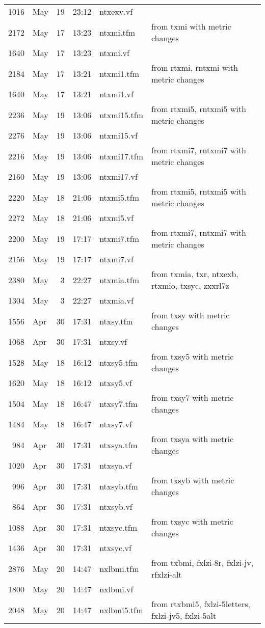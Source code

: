 \documentclass[10pt]{amsart}
\begin{document}
\begin{center}
\begin{longtable}{@{} rlrrll @{}}
1016&May&19&23:12&ntxexv.vf\\
2172&May&17&13:23&ntxmi.tfm& from txmi with metric changes\\
1640&May&17&13:23&ntxmi.vf\\
2184&May&17&13:21&ntxmi1.tfm& from rtxmi, rntxmi with metric changes\\
1640&May&17&13:21&ntxmi1.vf\\
2236&May&19&13:06&ntxmi15.tfm& from rtxmi5, rntxmi5 with metric changes\\
2276&May&19&13:06&ntxmi15.vf\\
2216&May&19&13:06&ntxmi17.tfm& from rtxmi7, rntxmi7 with metric changes\\
2160&May&19&13:06&ntxmi17.vf\\
2220&May&18&21:06&ntxmi5.tfm& from rtxmi5, rntxmi5 with metric changes\\
2272&May&18&21:06&ntxmi5.vf\\
2200&May&19&17:17&ntxmi7.tfm& from rtxmi7, rntxmi7 with metric changes\\
2156&May&19&17:17&ntxmi7.vf\\
2380&May&3&22:27&ntxmia.tfm& from txmia, txr, ntxexb, rtxmio, txsyc, zxxrl7z\\
1304&May&3&22:27&ntxmia.vf\\
1556&Apr&30&17:31&ntxsy.tfm& from txsy with metric changes\\
1068&Apr&30&17:31&ntxsy.vf\\
1528&May&18&16:12&ntxsy5.tfm& from txsy5 with metric changes\\
1620&May&18&16:12&ntxsy5.vf\\
1504&May&18&16:47&ntxsy7.tfm& from txsy7 with metric changes\\
1484&May&18&16:47&ntxsy7.vf\\
984&Apr&30&17:31&ntxsya.tfm& from txsya with metric changes\\
1020&Apr&30&17:31&ntxsya.vf\\
996&Apr&30&17:31&ntxsyb.tfm& from txsyb with metric changes\\
864&Apr&30&17:31&ntxsyb.vf\\
1088&Apr&30&17:31&ntxsyc.tfm& from txsyc with metric changes\\
1436&Apr&30&17:31&ntxsyc.vf\\
2876&May&20&14:47&nxlbmi.tfm& from txbmi, fxlzi-8r, fxlzi-jv, rfxlzi-alt\\
1800&May&20&14:47&nxlbmi.vf\\
2048&May&20&14:47&nxlbmi5.tfm& from rtxbmi5, fxlzi-5letters, fxlzi-jv5, fxlzi-5alt\\

\end{longtable}
\end{center}
\end{document}
